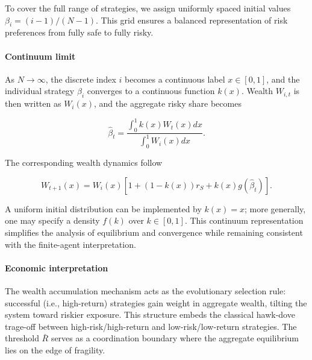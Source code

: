 \documentclass[11pt,a4paper]{article}
\begin{document}

To cover the full range of strategies, we assign uniformly spaced initial values $\beta_i = (i-1)/(N-1)$. This grid ensures a balanced representation of risk preferences from fully safe to fully risky. 

\paragraph{Continuum limit} As $N\rightarrow \infty$, the discrete index $i$ becomes a continuous label $x\in [0,1]$, and the individual strategy $\beta_i$ converges to a continuous function $k(x)$. Wealth $W_{i,t}$ is then written as $W_i(x)$, and the aggregate risky share becomes

\begin{equation}
    \label{eq:continuous_definition_of_hat_beta_t}
    \hat\beta_t = \frac{\int_0^1 k(x)W_t(x)dx}{\int_0^1 W_i(x)dx}.
\end{equation}

The corresponding wealth dynamics follow

\begin{equation}
    \label{eq:W_t+1_continuous}
    W_{t+1}(x) = W_i(x)[1+ (1-k(x))r_S + k(x)g(\hat\beta_t)].
\end{equation}

A uniform initial distribution can be implemented by $k(x)=x$; more generally, one may specify a density $f(k)$ over $k\in[0,1]$. This continuum representation simplifies the analysis of equilibrium and convergence while remaining consistent with the finite-agent interpretation. 

\paragraph{Economic interpretation} The wealth accumulation mechanism acts as the evolutionary selection rule: successful (i.e., high-return) strategies gain weight in aggregate wealth, tilting the system toward riskier exposure. This structure embeds the classical hawk-dove trage-off between high-risk/high-return and low-risk/low-return strategies. The threshold $\bar R$ serves as a coordination boundary where the aggregate equilibrium lies on the edge of fragility.
\end{document}
